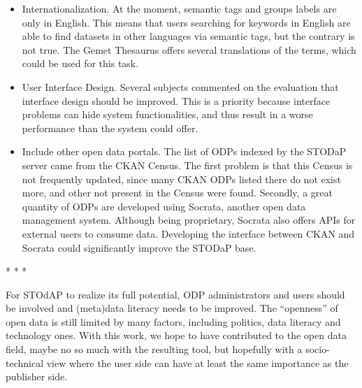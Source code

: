 \begin{itemize}
	\item Internationalization. At the moment, semantic tags and groups labels are only in English. This means that users searching for keywords in English are able to find datasets in other languages via semantic tags, but the contrary is not true. The Gemet Thesaurus offers several translations of the terms, which could be used for this task.
	\item User Interface Design. Several subjects commented on the evaluation that interface design should be improved. This is a priority because interface problems can hide system functionalities, and thus result in a worse performance than the system could offer.
	\item Include other open data portals. The list of ODPs indexed by the STODaP server came from the CKAN Census. The first problem is that this Census is not frequently updated, since many CKAN ODPs listed there do not exist more, and other not present in the Census were found. Secondly, a great quantity of ODPs are developed using Socrata, another open data management system. Although being proprietary, Socrata also offers APIs for external users to consume data. Developing the interface between CKAN and Socrata could significantly improve the STODaP base.
\end{itemize}

\vspace{1cm}
\begin{center}* * *
\end{center}
\vspace{1cm}

For STOdAP to realize its full potential, ODP administrators and users should be involved and (meta)data literacy needs to be improved.	
The ``openness'' of open data is still limited by many factors, including politics, data literacy and technology ones.
With this work, we hope to have contributed to the open data field, maybe no so much with the resulting tool, but hopefully with a socio-technical view where the user side can have at least the same importance as the publisher side.
